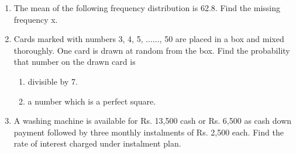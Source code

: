 \documentclass[journal,12pt,twocolumn]{IEEEtran}
\renewcommand\thesection{\arabic{section}}
\begin{document}
\begin{enumerate}[label=\thesection.\arabic*.,ref=\thesection.\theenumi]
\begin{figure}[h!]
\end{figure}
 \item The mean of the following frequency distribution is 62.8. Find the missing frequency x.
\\
\begin{table}[ht]
 \centering
 \caption{}
 \end{table}
 
\item Cards marked with numbers 3, 4, 5, ......, 50 are placed in a box and mixed thoroughly. One card is drawn at random from the box. Find the probability that number on the drawn card is
\begin{enumerate}
\item divisible by 7.
\item a number which is a perfect square.
\end{enumerate}
 
\item A washing machine is available for Rs. 13,500 cash or Rs. 6,500 as cash down payment followed by three monthly instalments of Rs. 2,500 each. Find the rate of interest charged under instalment plan.
\end{enumerate}
\end{document}
